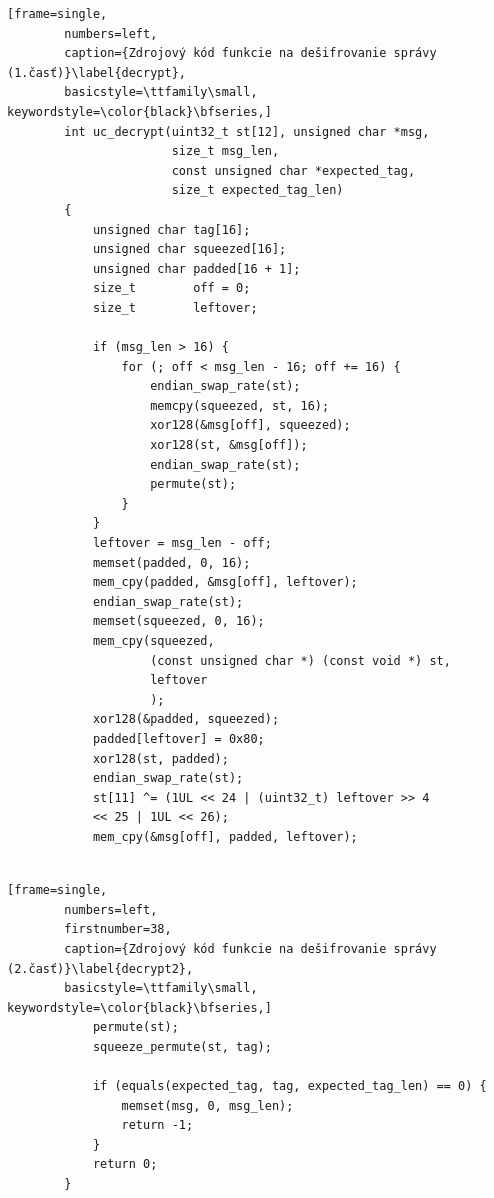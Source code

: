 \begin{minipage}{\textwidth} 	
	\begin{lstlisting}[frame=single,
		numbers=left,
		caption={Zdrojový kód funkcie na dešifrovanie správy (1.časť)}\label{decrypt},
		basicstyle=\ttfamily\small, keywordstyle=\color{black}\bfseries,]
		int uc_decrypt(uint32_t st[12], unsigned char *msg, 
		               size_t msg_len, 
		               const unsigned char *expected_tag,
		               size_t expected_tag_len)
		{
			unsigned char tag[16];
			unsigned char squeezed[16];
			unsigned char padded[16 + 1];
			size_t        off = 0;
			size_t        leftover;
			
			if (msg_len > 16) {
				for (; off < msg_len - 16; off += 16) {
					endian_swap_rate(st);
					memcpy(squeezed, st, 16);
					xor128(&msg[off], squeezed);
					xor128(st, &msg[off]);
					endian_swap_rate(st);
					permute(st);
				}
			}
			leftover = msg_len - off;
			memset(padded, 0, 16);
			mem_cpy(padded, &msg[off], leftover);
			endian_swap_rate(st);
			memset(squeezed, 0, 16);
			mem_cpy(squeezed, 
			        (const unsigned char *) (const void *) st, 
			        leftover
			        );
		    xor128(&padded, squeezed);
			padded[leftover] = 0x80;
			xor128(st, padded);
			endian_swap_rate(st);
			st[11] ^= (1UL << 24 | (uint32_t) leftover >> 4 
			<< 25 | 1UL << 26);
			mem_cpy(&msg[off], padded, leftover);
			
	\end{lstlisting}
\end{minipage}

\begin{minipage}{\textwidth} 	
	\begin{lstlisting}[frame=single,
		numbers=left,
		firstnumber=38,
		caption={Zdrojový kód funkcie na dešifrovanie správy (2.časť)}\label{decrypt2},
		basicstyle=\ttfamily\small, keywordstyle=\color{black}\bfseries,]
			permute(st);
			squeeze_permute(st, tag);
			
			if (equals(expected_tag, tag, expected_tag_len) == 0) {
				memset(msg, 0, msg_len);
				return -1;
			}
			return 0;
		}
	\end{lstlisting}
\end{minipage}\\

